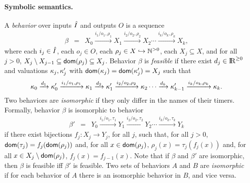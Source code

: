 \paragraph{Symbolic semantics.}
A \emph{behavior} over inputs $\hat{I}$ and outputs $O$ is a sequence 
\begin{eqnarray*}
\beta & = & X_0 \xrightarrow{i_1/o_1, \rho_1} X_1  \xrightarrow{i_2/o_2, \rho_2} X_2 \cdots \xrightarrow{i_k/o_k, \rho_k} X_{k},
\end{eqnarray*}
where each $i_j \in \hat{I}$, each $o_j \in O$, each $\rho_j \in X \hookrightarrow {\mathbb N}^{>0}$, each $X_j \subseteq X$, and
for all $j>0$, $X_j \setminus X_{j-1}  \subseteq {\textsf{dom}}(\rho_j) \subseteq X_j$.
Behavior $\beta$ is \emph{feasible} if there exist $d_j \in {\rm I\!R}^{\geq 0}$ and valuations $\kappa_j, \kappa'_j$ 
with ${\textsf{dom}}(\kappa_j) = {\textsf{dom}}(\kappa'_j) = X_j$ such that
\[
\kappa_0 \xrightarrow{d_1} \kappa'_0 \xrightarrow{i_1/o_1, \rho_1} \kappa_1 \xrightarrow{d_2} \kappa'_1 \xrightarrow{i_2/o_2, \rho_2} \kappa_2 \cdots
\xrightarrow{d_k} \kappa'_{k-1} \xrightarrow{i_k/o_k, \rho_k} \kappa_{k}.
\]
Two behaviors are \emph{isomorphic} if they only differ in the names of their timers. Formally, behavior $\beta$
is isomorphic to behavior
\begin{eqnarray*}
\beta' & = & Y_0 \xrightarrow{i_1/o_1, \tau_1} Y_1  \xrightarrow{i_2/o_2, \tau_2} Y_2 \cdots \xrightarrow{i_k/o_k, \tau_k} Y_{k}
\end{eqnarray*}
if there exist bijections $f_j : X_j \rightarrow Y_j$, for all $j$, such that, for all $j>0$, ${\textsf{dom}}(\tau_j) = f_j({\textsf{dom}}(\rho_j))$ and, for all $x \in{\textsf{dom}}(\rho_j)$,
$\rho_j(x) = \tau_j (f_j(x))$ and, for all $x \in X_j \setminus {\textsf{dom}}(\rho_j)$, $f_j(x) = f_{j-1}(x)$.
Note that if $\beta$ and $\beta'$ are isomorphic, then $\beta$ is feasible iff $\beta'$ is feasible.
Two sets of behaviors $A$ and $B$ are \emph{isomorphic} if for each behavior of $A$ there is an isomorphic behavior in $B$,
and vice versa.

